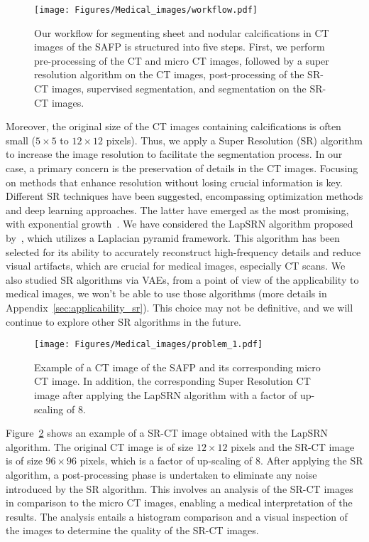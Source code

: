 \begin{figure}[htb!]
    \centering
    \texttt{[image: Figures/Medical\_images/workflow.pdf]}
    \caption{Our workflow for segmenting sheet and nodular calcifications in
    CT images of the SAFP is
    structured into five steps. First, we perform pre-processing of the CT and
    micro CT images, followed by a super resolution algorithm on the CT images,
    post-processing of the SR-CT images, supervised segmentation, and
    segmentation on the SR-CT images.}
    \label{fig:medical_images_workflow}
\end{figure}


Moreover, the original size of the CT images containing calcifications is often small
($5\times 5$ to $12\times 12$ pixels).
Thus, we apply a Super Resolution (SR) algorithm to increase the image  
resolution to facilitate the segmentation process.
In our case, a primary concern is the preservation of details in the CT images.
Focusing on methods that enhance resolution without losing crucial information
is key. 
Different SR techniques have
been suggested, encompassing optimization methods and deep learning approaches.
The latter have emerged as the most promising, with
exponential growth~\citep{li2021review}. 
We have considered the LapSRN algorithm proposed by~\cite{lai2017deep},
which  utilizes a Laplacian pyramid framework. 
This algorithm has been selected for its ability to accurately
 reconstruct high-frequency
details and reduce visual artifacts, which are crucial for medical images, especially CT scans.
We also studied SR algorithms via VAEs, from a point of view of 
the applicability to medical images, 
we won't be able to use those algorithms (more details in Appendix~\ref{sec:applicability_sr}).
This choice may not
be definitive, and we will continue to explore other SR algorithms in the future.\\
\begin{figure}[htb!]
    \centering
    \texttt{[image: Figures/Medical\_images/problem\_1.pdf]}
    \caption{Example of a CT image of the SAFP and its corresponding
    micro CT image. In addition, the corresponding Super Resolution CT image
    after applying the LapSRN algorithm with a factor of up-scaling of 8.}
    \label{fig:srct_example}
\end{figure}

Figure~\ref{fig:srct_example} 
shows an example of a SR-CT image obtained with the LapSRN algorithm.
The original CT image is of size $12\times 12$ pixels and the SR-CT image is of size
$96\times 96$ pixels, which is a factor of up-scaling of 8.
After applying the SR algorithm, a post-processing phase is undertaken to
eliminate any noise introduced by the SR algorithm. This
involves an analysis of the SR-CT images in comparison to the micro
CT images, enabling a medical interpretation of the results. The analysis
entails a histogram comparison and a visual inspection of the images to
determine the quality of the SR-CT images.


